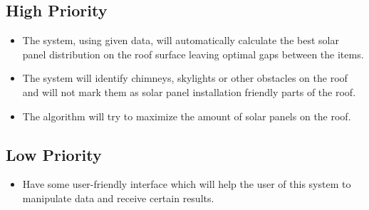 \documentclass[a4paper,12pt,fleqn]{article}
\begin{document}
\subsection{High Priority}
\begin{itemize}
    \item The system, using given data, will automatically calculate the best solar panel distribution on the roof surface leaving optimal gaps between the items.
    
    \item The system will identify chimneys, skylights or other obstacles on the roof and will not mark them as solar panel installation friendly parts of the roof. 
    
    \item The algorithm will try to maximize the amount of solar panels on the roof.
\end{itemize}

\subsection{Low Priority}
\begin{itemize}
    \item Have some user-friendly interface which will help the user of this system to manipulate data and receive certain results.  
\end{itemize}

\newpage
\end{document}
